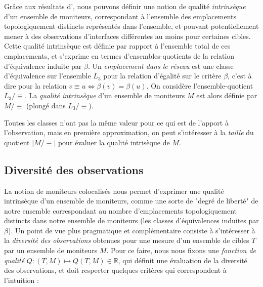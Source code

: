 Grâce aux résultats d'\udpexplore, nous pouvons définir une notion de qualité
\emph{intrinsèque} d'un ensemble de moniteurs, correspondant à l'ensemble des
emplacements topologiquement distincts représentés dans l'ensemble, et pouvant
potentiellement mener à des observations d'interfaces différentes au moins pour
certaines cibles. Cette qualité intrinsèque est définie par rapport à l'ensemble
total de ces emplacements, et s'exprime en termes d'ensembles-quotients de la
relation d'équivalence induite par $\beta$. Un \emph{emplacement dans le réseau}
est une classe d'équivalence sur l'ensemble $L_3$ pour la relation d'égalité sur
le critère $\beta$, c'est à dire pour la relation $v \equiv u \Leftrightarrow
\beta(v) = \beta(u)$. On considère l'ensemble-quotient $L_3/\equiv$. La
\emph{qualité intrinsèque} d'un ensemble de moniteurs $M$ est alors définie par
$M/\equiv$ (plongé dans $L_3/\equiv$).

Toutes les classes n'ont pas la même valeur pour ce qui est de l'apport à
l'observation, mais en première approximation, on peut s'intéresser à la
\emph{taille} du quotient $|M/\equiv|$ pour évaluer la qualité intrisèque de
$M$.

\subsection{Diversité des observations}
\label{subsec:udpping-monitors-diversity}

La notion de moniteurs colocalisés nous permet d'exprimer une qualité
intrinsèque d'un ensemble de moniteurs, comme une sorte de "degré de liberté"
\apriori de notre ensemble correspondant au nombre d'emplacements
topologiquement distincts dans notre ensemble de moniteurs (les classes
d'équivalences induites par $\beta$). Un point de vue plus pragmatique et
complémentaire consiste à s'intéresser \aposteriori à la \emph{diversité des
observations} obtenues pour une mesure d'un ensemble de cibles $T$ par un
ensemble de moniteurs $M$. Pour ce faire, nous nous fixons une \emph{fonction
de qualité} $Q : (T, M) \mapsto Q(T, M) \in {\mathbb R}$, qui définit une
évaluation de la diversité des observations, et doit respecter quelques
critères qui correspondent à l'intuition :

